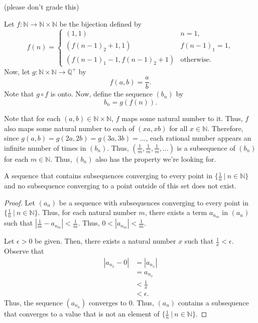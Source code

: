 \documentclass[12pt]{article}
\begin{document}
\bigskip
{} (please don't grade this)

Let $f: \mathbb N \to \mathbb N \times \mathbb N$ be the bijection defined by %
$$f(n) =
\begin{cases}
    (1, 1) & n = 1, \\
    (f(n-1)_2 + 1, 1) & f(n-1)_1 = 1, \\
    (f(n-1)_1-1, f(n-1)_2+1) & \text{otherwise}.
\end{cases}$$
Now, let $g: \mathbb N \times \mathbb N \to \mathbb Q^+$ by $$f(a, b) = \frac ab.$$
Note that $g \circ f$ is onto. Now, define the sequence $(b_n)$ by $$b_n = g(f(n)).$$

Note that for each $(a, b) \in \mathbb N \times \mathbb N$, $f$ maps some natural number to it. Thus, $f$ also maps some natural number to each of $(xa, xb)$ for all $x \in \mathbb N$. Therefore, since $g(a,b) = g(2a, 2b) = g(3a, 3b) = \hdots$, each rational number appears an infinite number of times in $(b_n)$. Thus, $(\frac1m, \frac1m, \frac1m, \hdots)$ is a subsequence of $(b_n)$ for each $m \in \mathbb N$. Thus, $(b_n)$ also has the property we're looking for.

\newpage
{} A sequence that contains subsequences converging to every point in $\{\frac1n~|~n \in \mathbb N\}$ and no subsequence converging to a point outside of this set does not exist.
\begin{proof}
    Let $(a_n)$ be a sequence with subsequences converging to every point in $\{\frac1n~|~n \in \mathbb N\}$. Thus, for each natural number $m$, there exists a term $a_{n_m}$ in $(a_n)$ such that $|\frac1m - a_{n_m}| < \frac1m$. Thus, $0 < |a_{n_m}| < \frac1m$.
    
    Let $\epsilon > 0$ be given. Then, there exists a natural number $x$ such that $\frac1x < \epsilon$. Observe that
    \begin{align*}
        |a_{n_x} - 0| &= |a_{n_x}| \\
                      &= a_{n_x} \\
                      &< \frac1x \\
                      &< \epsilon.
    \end{align*}
    Thus, the sequence $(a_{n_k})$ converges to 0. Thus, $(a_n)$ contains a subsequence that converges to a value that is not an element of $\{\frac1n~|~n \in \mathbb N\}$.
\end{proof}
\end{document}
